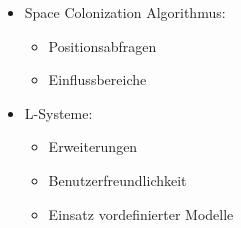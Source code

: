 \newpage
\begin{itemize}
	\item Space Colonization Algorithmus:
	\begin{itemize}
		\item Positionsabfragen\\
		
		\item Einflussbereiche\\
		
	\end{itemize}
\end{itemize}

\begin{itemize}
	\item L-Systeme:
	\begin{itemize}
		\item Erweiterungen\\
		
		\item Benutzerfreundlichkeit\\
		
		\item Einsatz vordefinierter Modelle
	\end{itemize}
\end{itemize}




\newpage
{}
\nocite{*}




